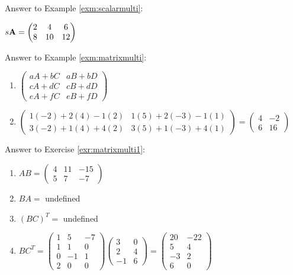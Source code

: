 \documentclass[]{book}
\theoremstyle{definition}
\theoremstyle{definition}
\theoremstyle{definition}
\theoremstyle{remark}
\begin{document}
Answer to Example \ref{exm:scalarmulti}:

\(s {\bf A} = \begin{pmatrix} 2 & 4 & 6 \\ 8 & 10 & 12 \end{pmatrix}\)

Answer to Example \ref{exm:matrixmulti}:

\begin{enumerate}
\def\labelenumi{\arabic{enumi}.}
\item
  \(\begin{pmatrix} aA+bC&aB+bD\\cA+dC&cB+dD\\eA+fC&eB+fD \end{pmatrix}\)
\item
  \(\begin{pmatrix} 1(-2)+2(4)-1(2)&1(5)+2(-3)-1(1)\\  3(-2)+1(4)+4(2)&3(5)+1(-3)+4(1)\end{pmatrix} =  \begin{pmatrix} 4&-2\\6&16\end{pmatrix}\)
\end{enumerate}

Answer to Exercise \ref{exr:matrixmulti1}:

\begin{enumerate}
\def\labelenumi{\arabic{enumi}.}
\item
  \(AB = \begin{pmatrix} 4 & 11 & -15 \\ 5 & 7 & -7 \end{pmatrix}\)
\item
  \(BA =\) undefined
\item
  \((BC)^T =\) undefined
\item
  \(BC^T = \begin{pmatrix} 1&5&-7\\1&1&0\\0&-1&1\\2&0&0\end{pmatrix}\begin{pmatrix} 3&0\\2&4\\-1&6 \end{pmatrix} =\begin{pmatrix}20 & -22 \\ 5 & 4 \\ -3 &2 \\6 & 0\end{pmatrix}\)
\end{enumerate}
\end{document}
